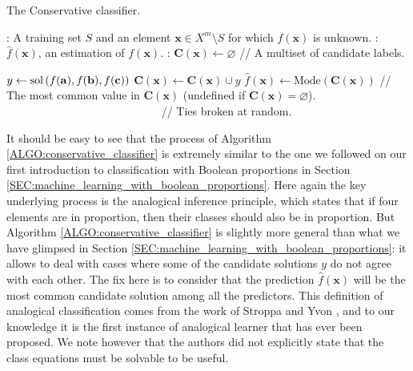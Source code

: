 \begin{algorithm}[!ht]
\caption{The Conservative classifier.}
\label{ALGO:conservative_classifier}
  \begin{algorithmic}
    : A training set $S$ and an element $\mathbf{x} \in X^m
    \setminus S$ for which $f(\mathbf{x})$ is unknown.
    : $\hat{f}(\mathbf{x})$, an estimation of
    $f(\mathbf{x})$.
    : $\mathbf{C}(\mathbf{x}) \leftarrow \varnothing$ \quad \quad // A multiset of candidate
    labels.

    \STATE $y \leftarrow \text{sol}\left(f(\mathbf{a}), f(\mathbf{b}), f(\mathbf{c})\right)$
    \STATE $ \mathbf{C}(\mathbf{x}) \leftarrow \mathbf{C}(\mathbf{x}) \cup y$
    \ENDIF
	  \ENDFOR
    \STATE $\hat{f}(\mathbf{x}) \leftarrow \text{Mode} (\mathbf{C}(\mathbf{x}))$ // The most common value in
    $\mathbf{C}(\mathbf{x})$ (undefined if $\mathbf{C}(\mathbf{x}) = \varnothing$).
    \STATE ~~~~~~~~~~~~~~~~~~~~~~~~~~~ // Ties broken at random.
  \end{algorithmic}
\end{algorithm}

It should be easy to see that the process of Algorithm
\ref{ALGO:conservative_classifier} is extremely similar to the one we followed
on our first introduction to classification with Boolean proportions in
Section \ref{SEC:machine_learning_with_boolean_proportions}. Here again the key
underlying process is the analogical inference principle, which states that if
four elements are in proportion, then their classes should also be in
proportion. But Algorithm \ref{ALGO:conservative_classifier} is slightly more
general than what we have glimpsed in Section
\ref{SEC:machine_learning_with_boolean_proportions}: it allows to deal with
cases where some of the candidate solutions $y$ do not agree with each other.
The fix here is to consider that the prediction $\hat{f}(\mathbf{x})$ will be
the most common candidate solution among all the predictors. This definition of
analogical classification comes from the work of Stroppa and Yvon
\cite{StrYvoCNLL05, StrYvoREPORT05}, and to our knowledge it is the first
instance of analogical learner that has ever been proposed. We note however
that the authors did not explicitly state that the class equations must be
solvable to be useful.

